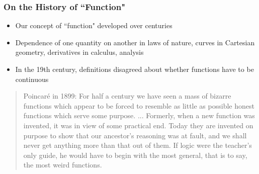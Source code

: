 \begin{frame}
\frametitle{On the History of ``Function"}

\begin{itemize}[<+->]

\item Our concept of ``function" developed over centuries

\item Dependence of one quantity on another in laws of nature, curves in Cartesian geometry, derivatives in calculus, analysis 

\item In the 19th century, definitions disagreed about whether functions have to be continuous

\end{itemize}
\pause
\begin{quote}
\small{Poincar{\'e} in 1899: For half a century we have seen a mass of bizarre functions which appear to be forced to resemble as little as possible honest functions which serve some purpose. ... Formerly, when a new function was invented, it was in view of some practical end. Today they are invented on purpose to show that our ancestor's reasoning was at fault, and we shall never get anything more than that out of them. If logic were the teacher's only guide, he would have to begin with the most general, that is to say, the most weird functions.}
\end{quote}

\end{frame}

